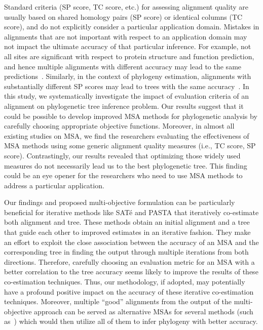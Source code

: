 Standard criteria (SP score, TC score, etc.) for assessing alignment quality are usually based on shared homology pairs (SP score) or identical columns (TC score), and do not explicitly consider a particular application domain. Mistakes in alignments that are not important with respect to an application domain may not impact the ultimate accuracy of that particular inference. For example, not all sites are significant with respect to protein structure and function prediction, and hence multiple alignments with different accuracy may lead to the same predictions~\citep{warnow2013large}. Similarly, in the context of phylogeny estimation, alignments with substantially different SP scores may lead to trees with the same accuracy~\citep{liu2009rapid}. In this study, we systematically investigate the impact of evaluation criteria of an alignment on phylogenetic tree inference problem. Our results suggest that it could be possible to develop improved MSA methods for phylogenetic analysis by carefully choosing appropriate objective functions. Moreover, in almost all existing studies on MSA, we find the researchers evaluating the effectiveness of MSA methods using some generic alignment quality measures (i.e., TC score, SP score). Contrastingly, our results revealed that optimizing those widely used measures do not necessarily lead us to the best phylogenetic tree. This finding could be an eye opener for the researchers who need to use MSA methods to address a particular application. 

Our findings and proposed multi-objective formulation can be particularly beneficial for iterative methods like SAT\'e and PASTA that iteratively co-estimate both alignment and tree. These methods obtain an initial alignment and a tree that guide each other to improved estimates in an iterative fashion. They make an effort to exploit the close association between the accuracy of an MSA and the corresponding tree in finding the output through multiple iterations from both directions. Therefore, carefully choosing an evaluation metric for an MSA with a better correlation to the tree accuracy seems likely to improve the results of these co-estimation techniques. Thus, our methodology, if adopted, may potentially have a profound positive impact on the accuracy of these iterative co-estimation techniques. Moreover, multiple ``good'' alignments from the output of the multi-objective approach can be served as alternative MSAs for several methods (such as~\citep{ashkenazy2018multiple}) which would then utilize all of them to infer phylogeny with better accuracy.

